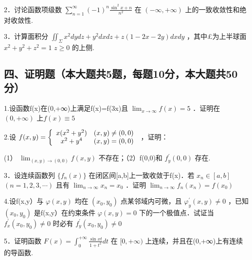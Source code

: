 \documentclass[11pt,fontset=fandol]{ctexart}
\begin{document}
2．讨论函数项级数
\(\sum _ { n = 1 } ^ { \infty } ( - 1 ) ^ { n } { \frac { \sin ^ { 2 } x + n } { n ^ { 2 } } }\)
在 \(( - \infty , + \infty )\) 上的一致收敛性和绝对收敛性.

3．计算面积分
\(\iint _ { \Sigma } { x ^ { 2 } d y d z } + { y ^ { 2 } d x d z } + z ( 1 - 2 x - 2 y ) d x d y\)
，其中£为上半球面\(x ^ { 2 } + y ^ { 2 } + z ^ { 2 } = 1\) \(z \geq 0\)
的上侧.

\subsection{四、证明题（本大题共5题，每题10分，本大题共50分）}\label{ux56dbux8bc1ux660eux9898ux672cux5927ux9898ux51715ux9898ux6bcfux989810ux5206ux672cux5927ux9898ux517150ux5206}

1.设函数f(x)在(0,+∞)上满足f(x)=f(3x)且
\(\lim _ { x \to \infty } f ( x ) = 5\) ．证明在 \(( 0 , + \infty )\)
上\(f ( x ) \equiv 5\)

2.设
\(f ( x , y ) = \left\{ \begin{array} { c c } { { x ( x ^ { 2 } + y ^ { 2 } ) } } & { { ( x , y ) \neq ( 0 , 0 ) } } \\ { { x ^ { 2 } + y ^ { 4 } } } & { { ( x , y ) = ( 0 , 0 ) } } \end{array} \right.\)
，证明：

(1） \(\lim _ { ( x , y ) \to ( 0 , 0 ) } f ( x , y )\)
不存在；（2）f(0,0)和 \(f _ { y } ^ { \prime } ( 0 , 0 )\) 存在.

3．设连续函数列 \(\{ f _ { n } ( x ) \}\)
在闭区间{[}a,b{]}上一致收敛于f(x)．若 \(x _ { n } \in [ a , b ]\)
\(( n = 1 , 2 , 3 , \cdots )\) 且有
\(\lim _ { n \to \infty } x _ { n } = x _ { 0 }\) ．证明
\(\lim _ { n \to \infty } f _ { n } ( x _ { n } ) = f ( x _ { 0 } )\)

4.设f(x,y）与 \(\varphi ( x , y )\) 均在 \(( x _ { 0 } , y _ { 0 } )\)
点某邻域内可微，且 \(\varphi _ { y } ^ { \prime } ( x , y ) \neq 0\)
，已知\(( x _ { 0 } , y _ { 0 } )\) 是f(x,y）在约束条件
\(\varphi ( x , y ) = 0\)
下的一个极值点．试证当\(f _ { x } ^ { \prime } ( x _ { 0 } , y _ { 0 } ) \neq 0\)
时必有 \(f _ { y } ^ { \prime } ( x _ { 0 } , y _ { 0 } ) \neq 0\)

5．证明函数
\(F ( x ) = \int _ { 0 } ^ { + \infty } \frac { \sin { x t } } { 1 + t ^ { 2 } } d t\)
在 \([ 0 , + \infty )\) 上连续，并且在(0,+∞)上有连续的导函数.
\end{document}
